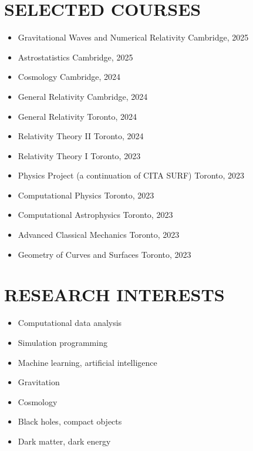 \documentclass[a4paper,10pt]{extarticle}
\begin{document}
\section*{SELECTED COURSES}
\begin{itemize}
    \item Gravitational Waves and Numerical Relativity \hfill Cambridge, 2025

    \item Astrostatistics \hfill Cambridge, 2025

    \item Cosmology \hfill Cambridge, 2024

    \item General Relativity \hfill Cambridge, 2024

    \item General Relativity \hfill Toronto, 2024
    
    \item Relativity Theory II \hfill Toronto, 2024

    \item Relativity Theory I \hfill Toronto, 2023

    \item Physics Project (a continuation of CITA SURF) \hfill Toronto, 2023

    \item Computational Physics \hfill Toronto, 2023

    \item Computational Astrophysics \hfill Toronto, 2023

    \item Advanced Classical Mechanics \hfill Toronto, 2023

    \item Geometry of Curves and Surfaces \hfill Toronto, 2023
\end{itemize}

\newpage
\section*{RESEARCH INTERESTS}
\begin{itemize}
    \item Computational data analysis

    \item Simulation programming

    \item Machine learning, artificial intelligence
    
    \item Gravitation

    \item Cosmology

    \item Black holes, compact objects

    \item Dark matter, dark energy
\end{itemize}
\end{document}
